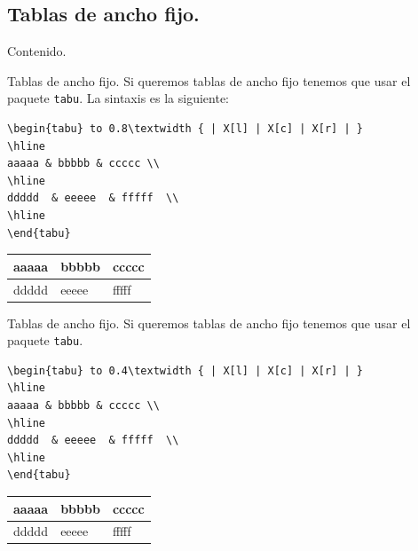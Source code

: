 \documentclass[dvipsnames,xcolor, handout]{beamer}
\theoremstyle{plain}
\theoremstyle{definition}
\begin{document}
\subsection{Tablas de ancho fijo.}
\begin{frame}{Contenido.}
\begin{multicols}{2}
  \tableofcontents[currentsubsection]
\end{multicols}
\end{frame}

\begin{frame}[fragile]{Tablas de ancho fijo.}
    Si queremos tablas de ancho fijo tenemos que usar el paquete \verb!tabu!. La sintaxis es la siguiente:\\\pause
\begin{verbatim}
\begin{tabu} to 0.8\textwidth { | X[l] | X[c] | X[r] | }
\hline
aaaaa & bbbbb & ccccc \\
\hline
ddddd  & eeeee  & fffff  \\
\hline
\end{tabu}
\end{verbatim}\pause

    \begin{tabu} to 0.8\textwidth { | X[l] | X[c] | X[r] | }
    \hline
    aaaaa & bbbbb & ccccc \\
    \hline
    ddddd  & eeeee  & fffff  \\
    \hline
    \end{tabu}
\end{frame}

\begin{frame}[fragile]{Tablas de ancho fijo.}
    Si queremos tablas de ancho fijo tenemos que usar el paquete \verb!tabu!. \\
\begin{verbatim}
\begin{tabu} to 0.4\textwidth { | X[l] | X[c] | X[r] | }
\hline
aaaaa & bbbbb & ccccc \\
\hline
ddddd  & eeeee  & fffff  \\
\hline
\end{tabu}
\end{verbatim}\pause

    \begin{tabu} to 0.4\textwidth { | X[l] | X[c] | X[r] | }
    \hline
    aaaaa & bbbbb & ccccc \\
    \hline
    ddddd  & eeeee  & fffff  \\
    \hline
    \end{tabu}
\end{frame}
\end{document}
